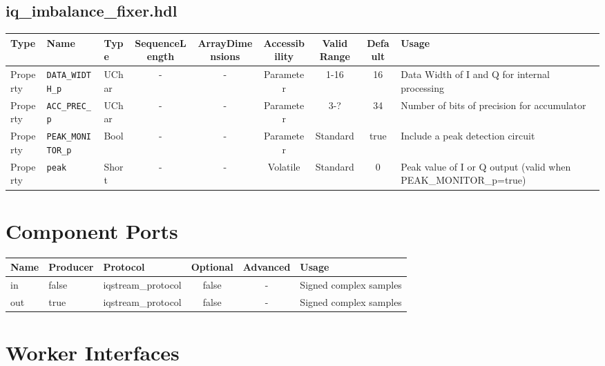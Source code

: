 \documentclass{article}
\def\comp{iq\_imbalance\_fixer}
\begin{document}
\begin{landscape}
\subsection*{\comp.hdl}
	\begin{scriptsize}
		\begin{tabular}{|p{3cm}|p{2cm}|p{1cm}|c|c|c|c|c|p{5cm}|}
			\hline
			\rowcolor{blue}
			Type     & Name                  & Type  & SequenceLength & ArrayDimensions & Accessibility       & Valid Range & Default & Usage                                        \\
			\hline
			Property & \verb+DATA_WIDTH_p+   & UChar & -              & -               & Parameter & 1-16        & 16      & Data Width of I and Q for internal processing\\
			\hline
			Property & \verb+ACC_PREC_p+     & UChar & -              & -               & Parameter & 3-?         & 34      & Number of bits of precision for accumulator\\
			\hline
			Property & \verb+PEAK_MONITOR_p+ & Bool  & -              & -               & Parameter & Standard    & true    &
			Include a peak detection circuit\\
			\hline
			Property & \verb+peak+           & Short & -              & -               & Volatile            & Standard    & 0       &
			Peak value of I or Q output (valid when PEAK\_MONITOR\_p=true)\\
			\hline
		\end{tabular}
	\end{scriptsize}

\section*{Component Ports}
\begin{scriptsize}
	\begin{tabular}{|M{2cm}|M{1.5cm}|M{4cm}|c|c|M{9cm}|}
		\hline
		\rowcolor{blue}
		Name & Producer & Protocol           & Optional & Advanced & Usage                  \\
		\hline
		in   & false    & iqstream\_protocol & false    & -        & Signed complex samples \\
		\hline
		out  & true     & iqstream\_protocol & false    & -        & Signed complex samples \\
		\hline
	\end{tabular}
\end{scriptsize}

\section*{Worker Interfaces}

\end{landscape}
\end{document}

